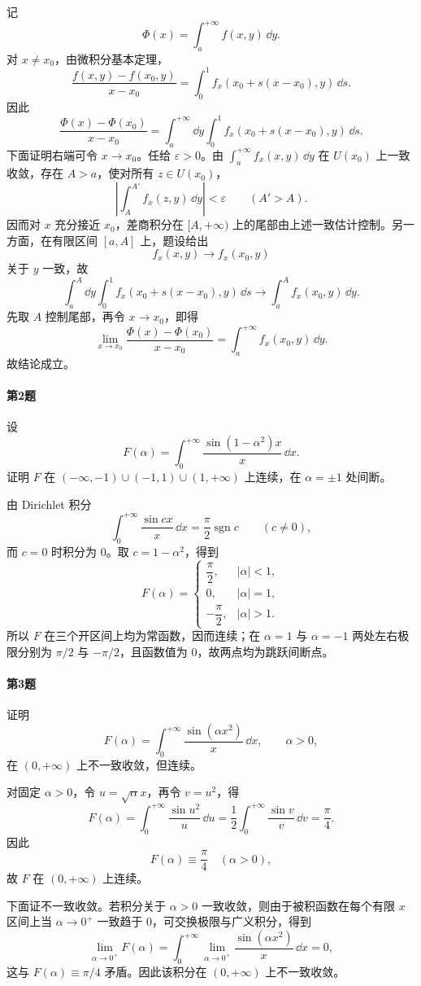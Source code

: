 \begin{xsolution}
记
\[
\Phi(x)=\int_a^{+\infty}f(x,y)\,\dd y.
\]
对 $x\neq x_0$，由微积分基本定理，
\[
\frac{f(x,y)-f(x_0,y)}{x-x_0}
=\int_0^1 f_x(x_0+s(x-x_0),y)\,\dd s.
\]
因此
\[
\frac{\Phi(x)-\Phi(x_0)}{x-x_0}
=\int_a^{+\infty}\dd y\int_0^1 f_x(x_0+s(x-x_0),y)\,\dd s.
\]
下面证明右端可令 $x\to x_0$。任给 $\varepsilon>0$。由
$\int_a^{+\infty}f_x(x,y)\,\dd y$ 在 $U(x_0)$ 上一致收敛，存在 $A>a$，使对所有 $z\in U(x_0)$，
\[
\left|\int_A^{A'}f_x(z,y)\,\dd y\right|<\varepsilon
\qquad(A'>A).
\]
因而对 $x$ 充分接近 $x_0$，差商积分在 $[A,+\infty)$ 上的尾部由上述一致估计控制。另一方面，在有限区间 $[a,A]$ 上，题设给出
\[
f_x(x,y)\to f_x(x_0,y)
\]
关于 $y$ 一致，故
\[
\int_a^A\dd y\int_0^1 f_x(x_0+s(x-x_0),y)\,\dd s
\to\int_a^A f_x(x_0,y)\,\dd y.
\]
先取 $A$ 控制尾部，再令 $x\to x_0$，即得
\[
\lim_{x\to x_0}\frac{\Phi(x)-\Phi(x_0)}{x-x_0}
=\int_a^{+\infty}f_x(x_0,y)\,\dd y.
\]
故结论成立。
\end{xsolution}

\paragraph{第2题}
设
\[
F(\alpha)=\int_0^{+\infty}\frac{\sin(1-\alpha^2)x}{x}\,\dd x.
\]
证明 $F$ 在 $(-\infty,-1)\cup(-1,1)\cup(1,+\infty)$ 上连续，在 $\alpha=\pm1$ 处间断。

\begin{xsolution}
由 Dirichlet 积分
\[
\int_0^{+\infty}\frac{\sin cx}{x}\,\dd x
=\frac\pi2\operatorname{sgn}c
\qquad(c\neq0),
\]
而 $c=0$ 时积分为 $0$。取 $c=1-\alpha^2$，得到
\[
F(\alpha)=
\begin{cases}
\dfrac\pi2,&|\alpha|<1,\\
0,&|\alpha|=1,\\
-\dfrac\pi2,&|\alpha|>1.
\end{cases}
\]
所以 $F$ 在三个开区间上均为常函数，因而连续；在 $\alpha=1$ 与 $\alpha=-1$ 两处左右极限分别为 $\pi/2$ 与 $-\pi/2$，且函数值为 $0$，故两点均为跳跃间断点。
\end{xsolution}

\paragraph{第3题}
证明
\[
F(\alpha)=\int_0^{+\infty}\frac{\sin(\alpha x^2)}x\,\dd x,
\qquad \alpha>0,
\]
在 $(0,+\infty)$ 上不一致收敛，但连续。

\begin{xsolution}
对固定 $\alpha>0$，令 $u=\sqrt\alpha x$，再令 $v=u^2$，得
\[
F(\alpha)=\int_0^{+\infty}\frac{\sin u^2}{u}\,\dd u
=\frac12\int_0^{+\infty}\frac{\sin v}{v}\,\dd v
=\frac\pi4.
\]
因此
\[
\boxed{F(\alpha)\equiv\frac\pi4\quad(\alpha>0)},
\]
故 $F$ 在 $(0,+\infty)$ 上连续。

下面证不一致收敛。若积分关于 $\alpha>0$ 一致收敛，则由于被积函数在每个有限 $x$ 区间上当 $\alpha\to0^+$ 一致趋于 $0$，可交换极限与广义积分，得到
\[
\lim_{\alpha\to0^+}F(\alpha)
=\int_0^{+\infty}\lim_{\alpha\to0^+}
\frac{\sin(\alpha x^2)}x\,\dd x=0,
\]
这与 $F(\alpha)\equiv\pi/4$ 矛盾。因此该积分在 $(0,+\infty)$ 上不一致收敛。
\end{xsolution}

